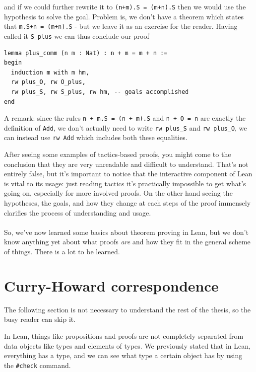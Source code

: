 \documentclass{book}
\theoremstyle{definition}
\theoremstyle{remark}
\theoremstyle{plain}
\begin{document}
and if we could further rewrite it to \lstinline{(n+m).S = (m+n).S} then we would use the hypothesis
to solve the goal.
Problem is, we don't have a theorem which states that \lstinline{m.S+n = (m+n).S} - but we leave it as an exercise for the reader.
Having called it \lstinline{S_plus} we can thus conclude our proof
\begin{lstlisting}
lemma plus_comm (n m : Nat) : n + m = m + n :=
begin
  induction m with m hm,
  rw plus_O, rw O_plus,
  rw plus_S, rw S_plus, rw hm, -- goals accomplished
end
\end{lstlisting}
A remark: since the rules \lstinline{n + m.S = (n + m).S} and \lstinline{n + O = n} are exactly the definition of \lstinline{Add},
we don't actually need to write \lstinline{rw plus_S} and \lstinline{rw plus_O}, we can instead use \lstinline{rw Add}
which includes both these equalities.

After seeing some examples of tactics-based proofs,
you might come to the conclusion that they are very unreadable and difficult to understand.
That's not entirely false, but it's important to notice that the interactive component of Lean is vital to its usage:
just reading tactics it's practically impossible to get what's going on, especially for more involved proofs.
On the other hand seeing the hypotheses, the goals, and how they change at each steps of the proof
immensely clarifies the process of understanding and usage.

\paragraph{}

So, we've now learned some basics about theorem proving in Lean,
but we don't know anything yet about what proofs \textit{are} and how they fit in the general scheme of things.
There is a lot to be learned.

\section{Curry-Howard correspondence}

The following section is not necessary to understand the rest of the thesis,
so the busy reader can skip it.

In Lean, things like propositions and proofs are not completely separated from data objects like types and elements of types.
We previously stated that in Lean, everything has a type, and we can see what type a certain object has by using the \lstinline{#check} command.
\end{document}
